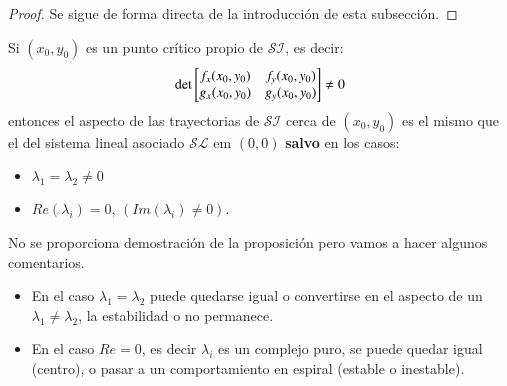 \begin{proof}
    Se sigue de forma directa de la introducción de esta subsección.
\end{proof}
\begin{pro}
    Si $(x_0, y_0)$ es un punto crítico propio de $\mathcal{SI}$, es decir:
    $$
        \mathrm{det}\mx{f_x(x_0, y_0) & f_y(x_0, y_0) \\ g_x(x_0, y_0) & g_y(x_0, y_0)} \neq 0
    $$
    entonces el aspecto de las trayectorias de $\mathcal{SI}$ cerca de $(x_0, y_0)$ es el mismo que el del sistema lineal asociado $\mathcal{SL}$ em $(0, 0)$ \textbf{salvo} en los casos:
    \begin{itemize}
        \item $\lambda_1 = \lambda_2 \neq 0$
        \item $Re(\lambda_i) = 0$, $(Im(\lambda_i) \neq 0)$.
    \end{itemize}
\end{pro}
\begin{obs}
    No se proporciona demostración de la proposición pero vamos a hacer algunos comentarios.
    \begin{itemize}
        \item En el caso $\lambda_1 = \lambda_2$ puede quedarse igual o convertirse en el aspecto de un $\lambda_1 \neq \lambda_2$, la estabilidad o no permanece.
        \item En el caso $Re = 0$, es decir $\lambda_i$ es un complejo puro, se puede quedar igual (centro), o pasar a un comportamiento en espiral (estable o inestable).
    \end{itemize}
\end{obs}

